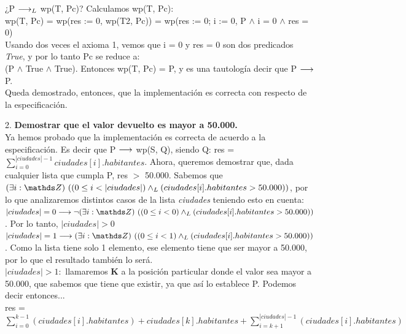 \documentclass[10pt,a4paper]{article}
\begin{document}
\begin{enumerate}
    ¿P $\longrightarrow _L$ wp(T, Pc)? Calculamos wp(T, Pc):\\

    wp(T, Pc) = wp(res := 0, wp(T2, Pc)) = wp(res := 0; i := 0, P $\wedge$ i = 0 $\wedge$ res = 0)\\ 
    Usando dos veces el axioma 1, vemos que i = 0 y res = 0 son dos predicados \textit{True}, y por lo tanto Pc se reduce a:\\ (P $\wedge$ True $\wedge$ True). Entonces wp(T, Pc) = P, y es una tautología decir que P $\longrightarrow$ P.\\
    Queda demostrado, entonces, que la implementación es correcta con respecto de la especificación.\\
\end{enumerate}
    
    

2. \textbf{Demostrar que el valor devuelto es mayor a 50.000.}\\

Ya hemos probado que la implementación es correcta de acuerdo a la especificación. Es decir que P $\longrightarrow$ wp(S, Q), siendo Q: res = $\sum\limits_{i=0}^{|ciudades| - 1}ciudades[i].habitantes$. Ahora, queremos demostrar que, dada cualquier lista que cumpla P, res $>$ 50.000.
Sabemos que $\existe[unalinea]{i}{\ent}{(0 \leq i < |ciudades|) \yLuego (ciudades[i].habitantes > 50.000)}$, por lo que analizaremos distintos casos de la lista \textit{ciudades} teniendo esto en cuenta:\\

$|ciudades| = 0 \implica \neg \existe[unalinea]{i}{\ent}{(0 \leq i < 0) \yLuego (ciudades[i].habitantes > 50.000)}$. Por lo tanto, $|ciudades| > 0$\\

$|ciudades| = 1 \implica \existe[unalinea]{i}{\ent}{(0 \leq i < 1) \yLuego (ciudades[i].habitantes > 50.000)}$. Como la lista tiene solo 1 elemento, ese elemento tiene que ser mayor a 50.000, por lo que el resultado también lo será.\\

$|ciudades| > 1:$ llamaremos \textbf{K} a la posición particular donde el valor sea mayor a 50.000, que sabemos que tiene que existir, ya que así lo establece P. Podemos decir entonces...\\

res = $\sum\limits_{i=0}^{k - 1}(ciudades[i].habitantes) + ciudades[k].habitantes + \sum\limits_{i=k+1}^{|ciudades| - 1}(ciudades[i].habitantes)$\\
\end{document}
